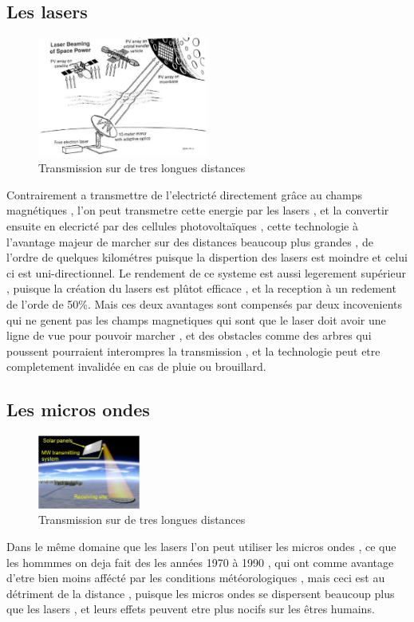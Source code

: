 \documentclass[12pt]{report}
\begin{document}
  \subsection{Les lasers}
\begin{figure}
  \begin{center}
    \includegraphics[width=0.5\textwidth]{laser}
  \end{center}
  \caption{Transmission sur de tres longues distances}
\end{figure}Contrairement a transmettre de l'electricté directement grâce au champs magnétiques , l'on peut transmetre cette energie par les lasers  , et la convertir ensuite en elecricté par des cellules photovoltaïques , cette technologie à l'avantage majeur de marcher sur des distances beaucoup plus grandes , de l'ordre de quelques kilométres puisque la dispertion des lasers est moindre et celui ci est uni-directionnel. Le rendement de ce systeme est aussi legerement supérieur , puisque la création du lasers est plûtot efficace , et la reception à un redement de l'orde de 50\%. Mais ces deux avantages sont compensés par deux incovenients qui ne genent pas les champs magnetiques qui sont que le laser doit avoir une ligne de vue pour pouvoir marcher , et des obstacles comme des arbres qui poussent pourraient interompres la transmission , et la technologie peut etre completement invalidée en cas de pluie ou brouillard.
    \subsection{Les micros ondes}
\begin{figure}
  \begin{center}
    \includegraphics[width=0.3\textwidth]{microwave}
  \end{center}
  \caption{Transmission sur de tres longues distances}
\end{figure}Dans le même domaine que les lasers l'on peut utiliser les micros ondes , ce que les hommmes on deja fait des les années 1970 à 1990 , qui ont comme avantage d'etre bien moins affécté par les conditions météorologiques , mais ceci est au détriment de la distance , puisque les micros ondes se dispersent beaucoup plus que les lasers , et leurs effets peuvent etre plus nocifs sur les êtres humains.
\end{document}
